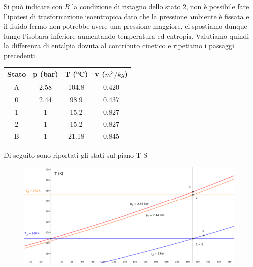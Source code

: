 \documentclass[a4paper,12pt]{article}
\begin{document}
Si può indicare con $B$ la condizione di ristagno dello stato 2, non è possibile fare l'ipotesi di trasformazione isoentropica dato che la pressione ambiente è fissata
e il fluido fermo non potrebbe avere una pressione maggiore, ci spostiamo dunque lungo l'isobara inferiore aumentando temperatura ed entropia.
Valutiamo quindi la differenza di entalpia dovuta al contributo cinetico e ripetiamo i passaggi precedenti.
\begin{center}
    \begin{tabular}{c|c|c|c}
        Stato   &p (bar)    &T (°C) &v ($m^3/kg$) \\ \hline
        A       &2.58       &104.8  &0.420  \\
        0       &2.44       &98.9   &0.437  \\
        1       &1          &15.2   &0.827  \\
        2       &1          &15.2   &0.827  \\
        B       &1          &21.18  &0.845
    \end{tabular}
\end{center}
Di seguito sono riportati gli stati sul piano T-S
\begin{figure}[H]
    \label{fig:trasformazioni_TS_azione}
    \centering
    \includegraphics[width=.90\linewidth]{media/trasformazioni_TS_azione.png}
\end{figure}
\end{document}
